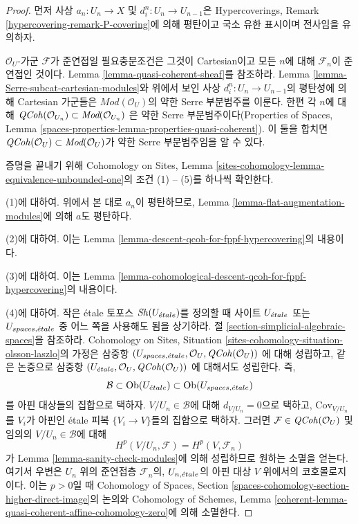\begin{proof}
먼저 사상 $a_n : U_n \to X$ 및 $d^n_i : U_n \to U_{n - 1}$은
Hypercoverings, Remark \ref{hypercovering-remark-P-covering}에 의해
평탄이고 국소 유한 표시이며 전사임을 유의하자.

\medskip\noindent
$\mathcal{O}_U$-가군 $\mathcal{F}$가 준연접일 필요충분조건은
그것이 Cartesian이고 모든 $n$에 대해 $\mathcal{F}_n$이
준연접인 것이다. Lemma \ref{lemma-quasi-coherent-sheaf}를 참조하라.
Lemma \ref{lemma-Serre-subcat-cartesian-modules}와 위에서 보인
사상 $d^n_i : U_n \to U_{n - 1}$의 평탄성에 의해
Cartesian 가군들은 $\textit{Mod}(\mathcal{O}_U)$의
약한 Serre 부분범주를 이룬다. 한편 각 $n$에 대해
$\mathit{QCoh}(\mathcal{O}_{U_n}) \subset \textit{Mod}(\mathcal{O}_{U_n})$
은 약한 Serre 부분범주이다(Properties of Spaces, Lemma
\ref{spaces-properties-lemma-properties-quasi-coherent}).
이 둘을 합치면
$\mathit{QCoh}(\mathcal{O}_U) \subset \textit{Mod}(\mathcal{O}_U)$가
약한 Serre 부분범주임을 알 수 있다.

\medskip\noindent
증명을 끝내기 위해 Cohomology on Sites, Lemma
\ref{sites-cohomology-lemma-equivalence-unbounded-one}의
조건 (1) -- (5)를 하나씩 확인한다.

\medskip\noindent
(1)에 대하여.
위에서 본 대로 $a_n$이 평탄하므로, Lemma
\ref{lemma-flat-augmentation-modules}에 의해 $a$도 평탄하다.

\medskip\noindent
(2)에 대하여. 이는 Lemma
\ref{lemma-descent-qcoh-for-fppf-hypercovering}의 내용이다.

\medskip\noindent
(3)에 대하여. 이는 Lemma
\ref{lemma-cohomological-descent-qcoh-for-fppf-hypercovering}의 내용이다.

\medskip\noindent
(4)에 대하여. 작은 \'etale 토포스 $\mathop{\mathit{Sh}}\nolimits(U_{\acute{e}tale})$를 정의할 때
사이트 $U_{\acute{e}tale}$ 또는 $U_{spaces, {\acute{e}tale}}$ 중 어느 쪽을 사용해도
됨을 상기하라. 절 \ref{section-simplicial-algebraic-spaces}을 참조하라.
Cohomology on Sites, Situation
\ref{sites-cohomology-situation-olsson-laszlo}의 가정은 삼중항\newline
$(U_{spaces, {\acute{e}tale}}, \mathcal{O}_U, \mathit{QCoh}(\mathcal{O}_U))$\newline
에 대해 성립하고, 같은 논증으로 삼중항\newline
$(U_{\acute{e}tale}, \mathcal{O}_U, \mathit{QCoh}(\mathcal{O}_U))$\newline
에 대해서도 성립한다.
즉,
$$
\mathcal{B} \subset \mathop{\mathrm{Ob}}\nolimits(U_{\acute{e}tale}) \subset \mathop{\mathrm{Ob}}\nolimits(U_{spaces, {\acute{e}tale}})
$$
를 아핀 대상들의 집합으로 택하자. $V/U_n \in \mathcal{B}$에 대해
$d_{V/U_n} = 0$으로 택하고, $\text{Cov}_{V/U_n}$를 $V_i$가 아핀인
\'etale 피복 $\{V_i \to V\}$들의 집합으로 택하자.
그러면 $\mathcal{F} \in \mathit{QCoh}(\mathcal{O}_U)$ 및 임의의
$V/U_n \in \mathcal{B}$에 대해
$$
H^p(V/U_n, \mathcal{F}) = H^p(V, \mathcal{F}_n)
$$
가 Lemma \ref{lemma-sanity-check-modules}에 의해 성립하므로
원하는 소멸을 얻는다. 여기서 우변은 $U_n$ 위의 준연접층
$\mathcal{F}_n$의, $U_{n, {\acute{e}tale}}$의 아핀 대상 $V$ 위에서의
코호몰로지이다. 이는 $p > 0$일 때 Cohomology of Spaces, Section
\ref{spaces-cohomology-section-higher-direct-image}의 논의와
Cohomology of Schemes, Lemma
\ref{coherent-lemma-quasi-coherent-affine-cohomology-zero}에 의해
소멸한다.


\end{proof}

